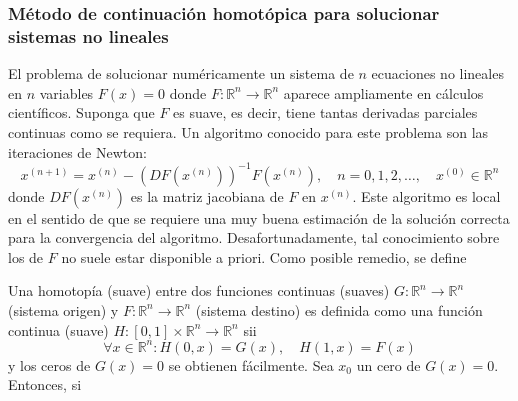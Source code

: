 \begin{frame}
	\frametitle{
		Método de continuación homotópica para solucionar sistemas no
		lineales
	}

	El problema de solucionar numéricamente un sistema de $n$
	ecuaciones no lineales en $n$ variables $F\left(x\right)=0$
	donde
	\begin{math}
		F\colon\mathbb{R}^{n}\to\mathbb{R}^{n}
	\end{math}
	aparece ampliamente en cálculos científicos.
	Suponga que $F$ es suave, es decir, tiene tantas derivadas
	parciales continuas como se requiera.
	Un algoritmo conocido para este problema son las
	\alert{iteraciones de Newton}:
	\begin{equation*}
		x^{\left(n+1\right)}=
		x^{\left(n\right)}-
		{\left(DF\left(x^{\left(n\right)}\right)\right)}^{-1}
		F\left(x^{\left(n\right)}\right),\quad
		n=0,1,2,\dotsc,\quad
		x^{\left(0\right)}\in\mathbb{R}^{n}
	\end{equation*}
	donde
	\begin{math}
		DF\left(x^{\left(n\right)}\right)
	\end{math}
	es la \alert{matriz jacobiana} de $F$ en $x^{\left(n\right)}$.
	Este algoritmo es \alert{local} en el sentido de que se requiere
	una muy buena estimación de la solución correcta para la
	convergencia del algoritmo.
	Desafortunadamente, tal conocimiento sobre los de $F$ no suele
	estar disponible a priori.
	Como posible remedio, se define

	\begin{definition}[homotopía]
		Una \alert{homotopía} (suave) entre dos funciones continuas
		(suaves)
		\begin{math}
			G\colon
			\mathbb{R}^{n}\to
			\mathbb{R}^{n}
		\end{math}
		(sistema origen) y
		\begin{math}
			F\colon
			\mathbb{R}^{n}\to
			\mathbb{R}^{n}
		\end{math}
		(sistema destino) es definida como una función continua (suave)
		\begin{math}
			H\colon
			\left[0,1\right]\times\mathbb{R}^{n}\to
			\mathbb{R}^{n}
		\end{math}
		sii
		\begin{equation*}
			\forall x\in\mathbb{R}^{n}:
			H\left(0,x\right)=
			G\left(x\right),\quad
			H\left(1,x\right)=
			F\left(x\right)
		\end{equation*}
		y los ceros de $G\left(x\right)=0$ se obtienen fácilmente.
		Sea $x_{0}$ un cero de $G\left(x\right)=0$.
		Entonces, si
	\end{definition}


\end{frame}
